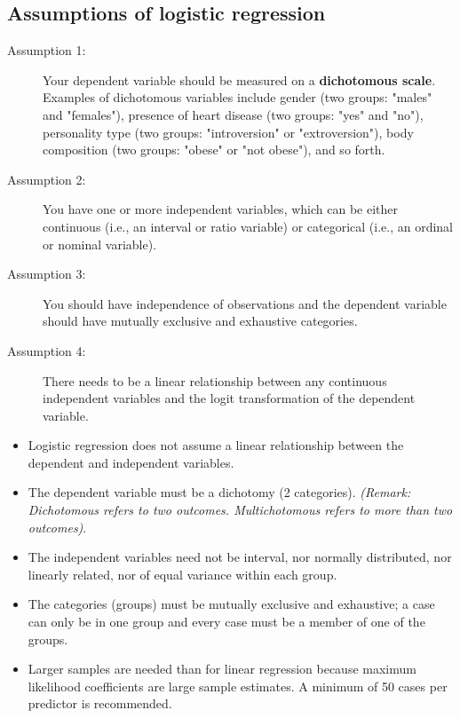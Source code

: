 \documentclass[a4paper,12pt]{article}
\begin{document}
\subsection{Assumptions of logistic regression}


\begin{description}
	\item[Assumption 1:] Your dependent variable should be measured on a \textbf{dichotomous scale}. Examples of dichotomous variables include gender (two groups: "males" and "females"), presence of heart disease (two groups: "yes" and "no"), personality type (two groups: "introversion" or "extroversion"), body composition (two groups: "obese" or "not obese"), and so forth. 
	
	
	\item[Assumption 2:] You have one or more independent variables, which can be either continuous (i.e., an interval or ratio variable) or categorical (i.e., an ordinal or nominal variable). 
	
	
	
	\item[Assumption 3:] You should have independence of observations and the dependent variable should have mutually exclusive and exhaustive categories.
	
	\item[Assumption 4:] There needs to be a linear relationship between any continuous independent variables and the logit transformation of the dependent variable. 
\end{description}
\begin{itemize}
	\item Logistic regression does not assume a linear relationship between the dependent and
	independent variables.
	\item The dependent variable must be a dichotomy (2 categories).
	\textit{(Remark: Dichotomous refers to two outcomes. Multichotomous refers to more than two outcomes)}.
	\item The independent variables need not be interval, nor normally distributed, nor linearly
	related, nor of equal variance within each group.
	\item The categories (groups) must be mutually exclusive and exhaustive; a case can only be
	in one group and every case must be a member of one of the groups.
	\item Larger samples are needed than for linear regression because maximum likelihood
	coefficients are large sample estimates. A minimum of 50 cases per predictor is
	recommended.
\end{itemize}	
\end{document}
